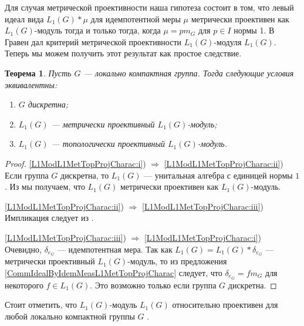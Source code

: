 \documentclass{article}
\numberwithin{equation}{section}
\theoremstyle{plain}
\newtheorem{theorem}{Теорема}
\theoremstyle{definition}
\newtheorem{proof}{Доказательство}\def\theproof{}
\newcommand{\convol}{\ast}
\begin{document}
\begin{fulltext}
Для случая метрической проективности наша гипотеза состоит в том, что 
левый идеал вида $L_1(G)\convol \mu$ для идемпотентной меры $\mu$ 
метрически проективен как $L_1(G)$-модуль тогда и только тогда, когда 
$\mu=p m_G$ для $p\in I$ нормы 1. В \cite{GravInjProjBanMod} Гравен 
дал критерий метрической проективности $L_1(G)$-модуля $L_1(G)$. 
Теперь мы можем получить этот результат как простое следствие.

\begin{theorem}\label{L1ModL1MetTopProjCharac} Пусть $G$ --- локально 
компактная группа. Тогда следующие условия эквивалентны:
\begin{enumerate}
    \item $G$ дискретна;
    \label{L1ModL1MetTopProjCharac:i}
    \item $L_1(G)$ --- метрически проективный $L_1(G)$-модуль;
    \label{L1ModL1MetTopProjCharac:ii}
    \item $L_1(G)$ --- топологически проективный $L_1(G)$-модуль.
    \label{L1ModL1MetTopProjCharac:iii}
\end{enumerate}
\end{theorem}
\begin{proof} \ref{L1ModL1MetTopProjCharac:i}) $\Longrightarrow$ 
\ref{L1ModL1MetTopProjCharac:ii}) Если группа $G$ дискретна, 
то $L_1(G)$ --- унитальная алгебра с единицей нормы $1$. Из 
\cite[предложение~7]{NemMetTopProjIdBanAlg} мы получаем, что 
$L_1(G)$ метрически проективен как $L_1(G)$-модуль.

\ref{L1ModL1MetTopProjCharac:ii}) $\Longrightarrow$ 
\ref{L1ModL1MetTopProjCharac:iii}) Импликация следует из 
\cite[предложение~2.4]{NemGeomProjInjFlatBanMod}.

\ref{L1ModL1MetTopProjCharac:iii}) $\Longrightarrow$ 
\ref{L1ModL1MetTopProjCharac:i}) Очевидно, $\delta_{e_G}$ --- идемпотентная 
мера. Так как $L_1(G)=L_1(G)\convol \delta_{e_G}$ --- метрически проективный 
$L_1(G)$-модуль, то из предложения \ref{CommIdealByIdemMeasL1MetTopProjCharac} 
следует, что $\delta_{e_G}=f m_G$ для некоторого $f\in L_1(G)$. Это возможно 
только если группа $G$ дискретна.
\end{proof}

Стоит отметить, что $L_1(G)$-модуль $L_1(G)$ относительно проективен для любой 
локально компактной группы $G$ \cite[упражнение~7.1.17]{HelBanLocConvAlg}.


\end{fulltext}
\end{document}
